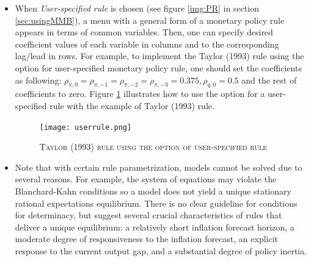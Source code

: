 
\begin{itemize}
  \item When \textit{User-specified rule} is chosen (see figure \ref{img:PR} in section \ref{sec:usingMMB}), a menu with a general form of a monetary policy rule appears in terms of common variables. Then, one can specify desired coefficient values of each variable in columns and to the corresponding lag/lead in rows.
      For example, to implement the Taylor (1993) rule using the option for user-specified monetary policy rule, one should set the coefficients as following: $ \rho_{\pi,0} = \rho_{\pi,-1} = \rho_{\pi,-2} = \rho_{\pi,-3} = 0.375, \rho_{q,0} = 0.5 $ and the rest of coefficients to zero. Figure \ref{img:userruletaylor} illustrates how to use the option for a user-specified rule with the example of Taylor (1993) rule. \\

        \begin{figure}[H]
        \centering
        \caption{\textsc{Taylor (1993) rule using the option of user-specified rule }}
        \vspace{0.2cm}
        \texttt{[image: userrule.png]}
        \label{img:userruletaylor}
        \end{figure}

  \item Note that with certain rule parametrization, models cannot be solved due to several reasons. For example, the system of equations may violate the Blanchard-Kahn conditions so a model does not yield a unique stationary rational expectations equilibrium. There is no clear guideline for conditions for determinacy, but \cite{LevinWielandWilliams2003} suggest several crucial characteristics of rules that deliver a unique equilibrium: a relatively short inflation forecast horizon, a moderate degree of responsiveness to the inflation forecast, an explicit response to the current output gap, and a substantial degree of policy inertia.
\end{itemize}


